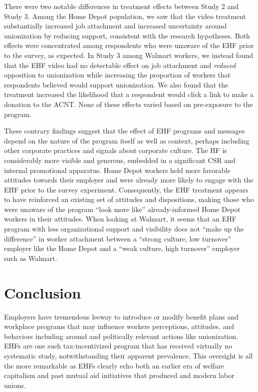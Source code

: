 \documentclass[
  11pt,
  oneside]{article}
\begin{document}
There were two notable differences in treatment effects between Study 2 and Study 3. Among the Home Depot population, we saw that the video treatment substantially increased job attachment and increased uncertainty around unionization by reducing support, consistent with the research hypotheses. Both effects were concentrated among respondents who were unaware of the EHF prior to the survey, as expected. In Study 3 among Walmart workers, we instead found that the EHF video had no detectable effect on job attachment and \emph{reduced} opposition to unionization while increasing the proportion of workers that respondents believed would support unionization. We also found that the treatment increased the likelihood that a respondent would click a link to make a donation to the ACNT. None of these effects varied based on pre-exposure to the program.

These contrary findings suggest that the effect of EHF programs and messages depend on the nature of the program itself as well as context, perhaps including other corporate practices and signals about corporate culture. The HF is considerably more visible and generous, embedded in a significant CSR and internal promotional apparatus. Home Depot workers held more favorable attitudes towards their employer and were already more likely to engage with the EHF prior to the survey experiment. Consequently, the EHF treatment appears to have reinforced an existing set of attitudes and dispositions, making those who were unaware of the program ``look more like'' already-informed Home Depot workers in their attitudes. When looking at Walmart, it seems that an EHF program with less organizational support and visibility does not ``make up the difference'' in worker attachment between a ``strong culture, low turnover'' employer like the Home Depot and a ``weak culture, high turnover'' employer such as Walmart.

\section{Conclusion}\label{conclusion}

Employers have tremendous leeway to introduce or modify benefit plans and workplace programs that may influence workers perceptions, attitudes, and behaviors including around and politically relevant actions like unionization. EHFs are one such tax-incentivized program that has received virtually no systematic study, notwithstanding their apparent prevalence. This oversight is all the more remarkable as EHFs clearly echo both an earlier era of welfare capitalism and past mutual aid initiatives that produced and modern labor unions.
\end{document}
